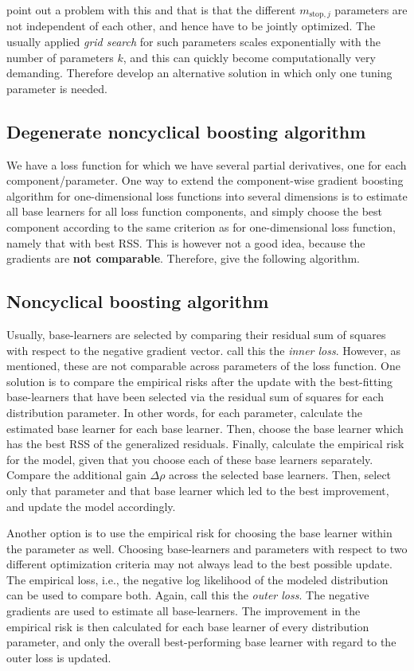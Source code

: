 \citet{thomas2018} point out a problem with this and that is that the different $m_{\text{stop},j}$ parameters are not independent of each other, and hence have to be jointly optimized. The usually applied \textit{grid search} for such parameters scales exponentially with the number of parameters $k$, and this can quickly become computationally very demanding. Therefore \citet{thomas2018} develop an alternative solution in which only one tuning parameter is needed.

\subsection{Degenerate noncyclical boosting algorithm}
We have a loss function for which we have several partial derivatives, one for each component/parameter. One way to extend the component-wise gradient boosting algorithm for one-dimensional loss functions into several dimensions is to estimate all base learners for all loss function components, and simply choose the best component according to the same criterion as for one-dimensional loss function, namely that with best RSS. This is however not a good idea, because the gradients are \textbf{not comparable}\citep{thomas2018}. Therefore, \citet{thomas2018} give the following algorithm.

\subsection{Noncyclical boosting algorithm}
Usually, base-learners are selected by comparing their residual sum of squares with respect to the negative gradient vector. \citet{thomas2018} call this the \textit{inner loss}. However, as mentioned, these are not comparable across parameters of the loss function. One solution is to compare the empirical risks after the update with the best-fitting base-learners that have been selected via the residual sum of squares for each distribution parameter. In other words, for each parameter, calculate the estimated base learner for each base learner. Then, choose the base learner which has the best RSS of the generalized residuals. Finally, calculate the empirical risk for the model, given that you choose each of these base learners separately. Compare the additional gain $\Delta\rho$ across the selected base learners. Then, select only that parameter and that base learner which led to the best improvement, and update the model accordingly.

Another option is to use the empirical risk for choosing the base learner within the parameter as well. Choosing base-learners and parameters with respect to two different optimization criteria may not always lead to the best possible update. The empirical loss, i.e., the negative log likelihood of the modeled distribution can be used to compare both. Again, \citet{thomas2018} call this the \textit{outer loss}. The negative gradients are used to estimate all base-learners. The improvement in the empirical risk is then calculated for each base learner of every distribution parameter, and only the overall best-performing base learner with regard to the outer loss is updated.

